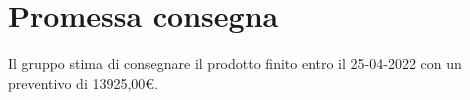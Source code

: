 \section{Promessa consegna}\label{section:promessa_consegna}

Il gruppo stima di consegnare il prodotto finito entro il 25-04-2022 con un preventivo di 13925,00€.
